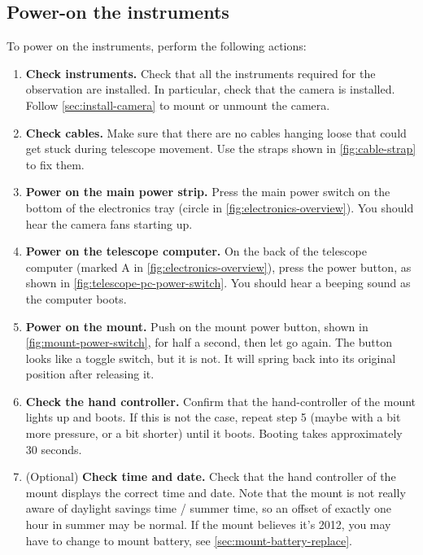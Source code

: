 \documentclass[a4paper, 11pt, fleqn]{memoir}
\begin{document}
\subsection{Power-on the instruments}

To power on the instruments, perform the following actions:
\begin{enumerate}
    \item \textbf{Check instruments.
          }
          Check that all the instruments required for the observation are installed.
          In particular, check that the camera is installed.
          Follow \cref{sec:install-camera} to mount or unmount the camera.
    \item \textbf{Check cables.}
          Make sure that there are no cables hanging loose that could get stuck during telescope movement.
          Use the straps shown in \cref{fig:cable-strap} to fix them.
    \item \textbf{Power on the main power strip.}
          Press the main power switch on the bottom of the electronics tray (circle in \cref{fig:electronics-overview}).
          You should hear the camera fans starting up.
    \item \textbf{Power on the telescope computer.}
          On the back of the telescope computer (marked A in \cref{fig:electronics-overview}), press the power button, as shown in \cref{fig:telescope-pc-power-switch}.
          You should hear a beeping sound as the computer boots.
    \item \textbf{Power on the mount.}
          Push on the mount power button, shown in \cref{fig:mount-power-switch}, for half a second, then let go again.
          The button looks like a toggle switch, but it is not.
          It will spring back into its original position after releasing it.
    \item \textbf{Check the hand controller.}
          Confirm that the hand-controller of the mount lights up and boots.
          If this is not the case, repeat step 5 (maybe with a bit more pressure, or a bit shorter) until it boots.
          Booting takes approximately 30 seconds.
    \item (Optional) \textbf{Check time and date.}
          Check that the hand controller of the mount displays the correct time and date.
          Note that the mount is not really aware of daylight savings time / summer time, so an offset of exactly one hour in summer may be normal.
          If the mount believes it's 2012, you may have to change to mount battery, see \cref{sec:mount-battery-replace}.
\end{enumerate}
\end{document}
